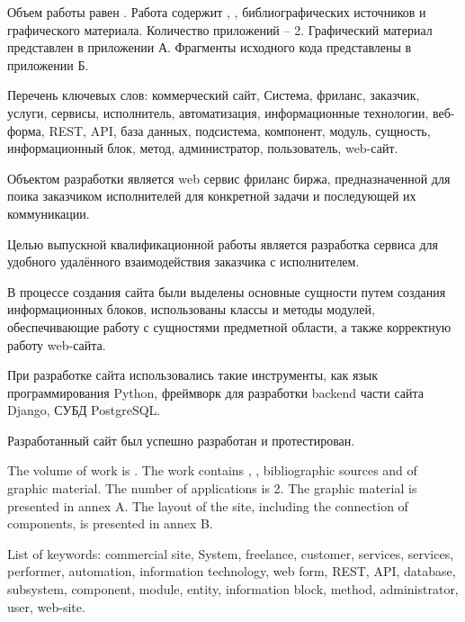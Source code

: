
Объем работы равен . Работа содержит , ,  библиографических источников и  графического материала. Количество приложений – 2. Графический материал представлен в приложении А. Фрагменты исходного кода представлены в приложении Б.

Перечень ключевых слов: коммерческий сайт, Система, фриланс, заказчик, услуги, сервисы, исполнитель, автоматизация, информационные технологии, веб-форма,  REST, API, база данных, подсистема, компонент, модуль, сущность, информационный блок, метод, администратор, пользователь, web-сайт.

Объектом разработки является web сервис фриланс биржа, предназначенной для поика заказчиком исполнителей для конкретной задачи и последующей их коммуникации.

Целью выпускной квалификационной работы является разработка сервиса для удобного удалённого взаимодействия заказчика с исполнителем.

В процессе создания сайта были выделены основные сущности путем создания информационных блоков, использованы классы и методы модулей, обеспечивающие работу с сущностями предметной области, а также корректную работу web-сайта.

При разработке сайта использовались такие инструменты, как язык программирования Python, фреймворк для разработки backend части сайта Django, СУБД PostgreSQL.

Разработанный сайт был успешно разработан и протестирован.

  
The volume of work is . The work contains , ,  bibliographic sources and  of graphic material. The number of applications is 2. The graphic material is presented in annex A. The layout of the site, including the connection of components, is presented in annex B.

List of keywords: commercial site, System, freelance, customer, services, services, performer, automation, information technology, web form, REST, API, database, subsystem, component, module, entity, information block, method, administrator, user, web-site.

